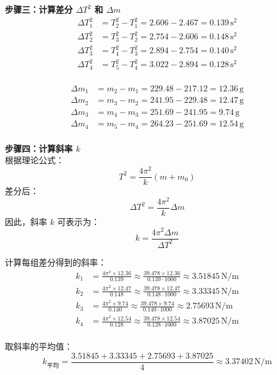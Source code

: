 \documentclass[zihao=5, UTF8]{article}
\theoremstyle{MyLineTheoremStyle} %
\theoremstyle{MyBlockTheoremStyle} %
\theoremstyle{MySubsubsectionStyle} %
\begin{document}
\textbf{步骤三：计算差分 \( \Delta T^2 \) 和 \( \Delta m \)} \\
\[
\begin{aligned}
\Delta T^2_{1} &= T_2^2 - T_1^2 = 2.606 - 2.467 = 0.139 \, \text{s}^2 \\
\Delta T^2_{2} &= T_3^2 - T_2^2 = 2.754 - 2.606 = 0.148 \, \text{s}^2 \\
\Delta T^2_{3} &= T_4^2 - T_3^2 = 2.894 - 2.754 = 0.140 \, \text{s}^2 \\
\Delta T^2_{4} &= T_5^2 - T_4^2 = 3.022 - 2.894 = 0.128 \, \text{s}^2 \\
\end{aligned}
\]

\[
\begin{aligned}
\Delta m_{1} &= m_2 - m_1 = 229.48 - 217.12 = 12.36 \, \text{g} \\
\Delta m_{2} &= m_3 - m_2 = 241.95 - 229.48 = 12.47 \, \text{g} \\
\Delta m_{3} &= m_4 - m_3 = 251.69 - 241.95 = 9.74 \, \text{g} \\
\Delta m_{4} &= m_5 - m_4 = 264.23 - 251.69 = 12.54 \, \text{g} \\
\end{aligned}
\]

\textbf{步骤四：计算斜率 \( k \)} \\
根据理论公式：
\[
T^2 = \frac{4\pi^2}{k}(m + m_0)
\]
差分后：
\[
\Delta T^2 = \frac{4\pi^2}{k} \Delta m
\]
因此，斜率 \( k \) 可表示为：
\[
k = \frac{4\pi^2 \Delta m}{\Delta T^2}
\]

计算每组差分得到的斜率：
\[
\begin{aligned}
k_1 &= \frac{4\pi^2 \times 12.36}{0.139} \approx \frac{39.478 \times 12.36}{0.139 \cdot 1000} \approx 3.51845 \, \text{N/m} \\
k_2 &= \frac{4\pi^2 \times 12.47}{0.148} \approx \frac{39.478 \times 12.47}{0.148 \cdot 1000} \approx 3.33345 \, \text{N/m} \\
k_3 &= \frac{4\pi^2 \times 9.74}{0.140} \approx \frac{39.478 \times 9.74}{0.140 \cdot 1000} \approx 2.75693 \, \text{N/m} \\
k_4 &= \frac{4\pi^2 \times 12.54}{0.128} \approx \frac{39.478 \times 12.54}{0.128 \cdot 1000} \approx 3.87025 \, \text{N/m} \\
\end{aligned}
\]

取斜率的平均值：
\[
k_{\text{平均}} = \frac{3.51845 + 3.33345 + 2.75693 + 3.87025}{4} \approx 3.37402 \, \text{N/m}
\]
\end{document}
